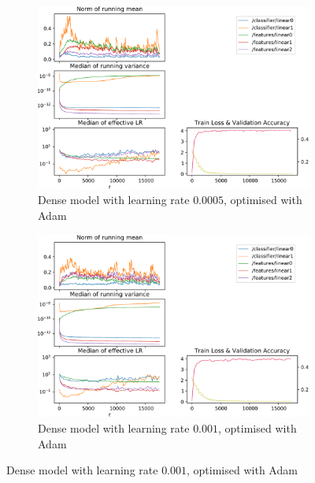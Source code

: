 \begin{figure}
    \caption{Adam metrics on fully linear model with different learning rates and
    Adam optimiser}
    \begin{subfigure}{\textwidth}
        \centering
        \includegraphics[width=\linewidth]{gfx/diagrams/experiments/adam/fullyconnectedmodel_adam_00005_0_-1.pdf}
        \caption{Dense model with learning rate $0.0005$, optimised with Adam}
    \end{subfigure}

    \begin{subfigure}{\textwidth}
        \centering
        \includegraphics[width=\linewidth]{gfx/diagrams/experiments/adam/fullyconnectedmodel_adam_0001_0_-1.pdf}
        \caption{Dense model with learning rate $0.001$, optimised with Adam}
    \end{subfigure}


\end{figure}

